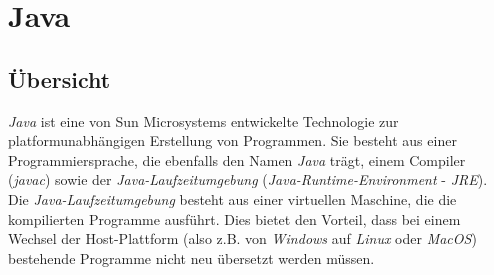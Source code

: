 \section{Java}
    \subsection{Übersicht}

        \emph{Java} ist eine von Sun Microsystems entwickelte Technologie zur platformunabhängigen 
        Erstellung von Programmen. Sie besteht aus einer Programmiersprache, die ebenfalls den Namen
        \emph{Java} trägt, einem Compiler (\emph{javac}) sowie der \emph{Java-Laufzeitumgebung} 
        (\emph{Java-Runtime-Environment} - \emph{JRE}).
        Die \emph{Java-Laufzeitumgebung} besteht aus einer virtuellen Maschine, die die kompilierten Programme ausführt.
        Dies bietet den Vorteil, dass bei einem Wechsel der Host-Plattform (also z.B. von \emph{Windows} auf \emph{Li\-nux}
        oder \emph{MacOS}) bestehende Programme nicht neu übersetzt werden müssen.\\

